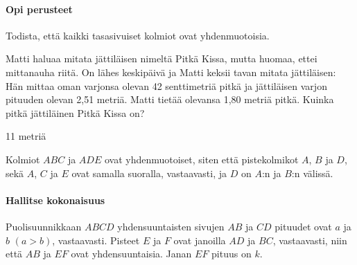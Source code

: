 \begin{tehtavasivu}

\paragraph*{Opi perusteet}

\begin{tehtava}
Todista, että kaikki tasasivuiset kolmiot ovat yhdenmuotoisia.
\end{tehtava}

\begin{tehtava}
Matti haluaa mitata jättiläisen nimeltä Pitkä Kissa, mutta huomaa, ettei mittanauha riitä. On lähes keskipäivä ja Matti keksii tavan mitata jättiläisen: Hän mittaa oman varjonsa olevan 42 senttimetriä pitkä ja jättiläisen varjon pituuden olevan 2,51 metriä. Matti tietää olevansa 1,80 metriä pitkä. Kuinka pitkä jättiläinen Pitkä Kissa on?

\begin{vastaus}
11 metriä
\end{vastaus}
\end{tehtava}

\begin{tehtava}
Kolmiot $ABC$ ja $ADE$ ovat yhdenmuotoiset, siten että pistekolmikot $A$, $B$ ja $D$, sekä $A$, $C$ ja $E$ ovat samalla suoralla, vastaavasti, ja $D$ on $A$:n ja $B$:n välissä.
\begin{alakohdat}
\end{alakohdat} 
\end{tehtava}

\paragraph*{Hallitse kokonaisuus}
\begin{tehtava}
Puolisuunnikkaan $ABCD$ yhdensuuntaisten sivujen $AB$ ja $CD$ pituudet ovat $a$ ja $b$ $(a > b)$, vastaavasti. Pisteet $E$ ja $F$ ovat janoilla $AD$ ja $BC$, vastaavasti, niin että $AB$ ja $EF$ ovat yhdensuuntaisia. Janan $EF$ pituus on $k$.

\begin{alakohdat}
\end{alakohdat}


\end{tehtava}
\end{tehtavasivu}
